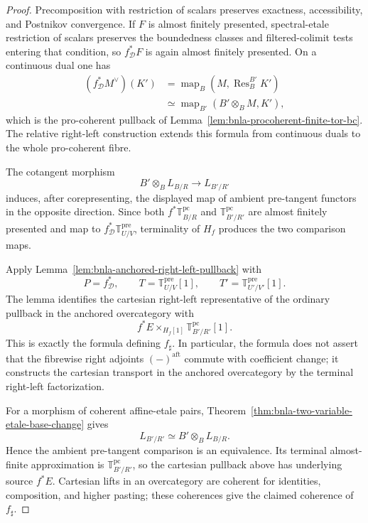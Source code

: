 \begin{proof}
Precomposition with restriction of scalars preserves exactness,
accessibility, and Postnikov convergence.  If $F$ is almost finitely
presented, spectral-etale restriction of scalars preserves the boundedness
classes and filtered-colimit tests entering that condition, so
$f_{\mathcal D}^*F$ is again almost finitely presented.  On a continuous
dual one has
\[
\begin{aligned}
(f_{\mathcal D}^*M^\vee)(K')
&=\operatorname{map}_B(M,\operatorname{Res}^{B'}_BK')\\
&\simeq
\operatorname{map}_{B'}(B'\otimes_BM,K'),
\end{aligned}
\]
which is the pro-coherent pullback of
Lemma~\ref{lem:bnla-procoherent-finite-tor-bc}.  The relative right-left
construction extends this formula from continuous duals to the whole
pro-coherent fibre.

The cotangent morphism
\[
    B'\otimes_BL_{B/R}
    \longrightarrow
    L_{B'/R'}
\]
induces, after corepresenting, the displayed map of ambient pre-tangent
functors in the opposite direction.  Since both
$f^*\mathbb T^{\mathrm{pc}}_{B/R}$ and
$\mathbb T^{\mathrm{pc}}_{B'/R'}$ are almost finitely presented and map to
$f_{\mathcal D}^*\mathbb T^{\mathrm{pre}}_{U/V}$, terminality of $H_f$
produces the two comparison maps.

Apply Lemma~\ref{lem:bnla-anchored-right-left-pullback} with
\[
    P=f_{\mathcal D}^*,
    \qquad
    T=\mathbb T^{\mathrm{pre}}_{U/V}[1],
    \qquad
    T'=\mathbb T^{\mathrm{pre}}_{U'/V'}[1].
\]
The lemma identifies the cartesian right-left representative of the ordinary
pullback in the anchored overcategory with
\[
    f^*E
    \times_{H_f[1]}
    \mathbb T^{\mathrm{pc}}_{B'/R'}[1].
\]
This is exactly the formula defining $f_\sharp$.  In particular, the formula
does not assert that the fibrewise right adjoints
$(-)^{\mathrm{aft}}$ commute with coefficient change; it constructs the
cartesian transport in the anchored overcategory by the terminal
right-left factorization.

For a morphism of coherent affine-etale pairs,
Theorem~\ref{thm:bnla-two-variable-etale-base-change} gives
\[
    L_{B'/R'}\simeq B'\otimes_BL_{B/R}.
\]
Hence the ambient pre-tangent comparison is an equivalence.  Its terminal
almost-finite approximation is
$\mathbb T^{\mathrm{pc}}_{B'/R'}$, so the cartesian pullback above has
underlying source $f^*E$.  Cartesian lifts in an overcategory are coherent
for identities, composition, and higher pasting; these coherences give the
claimed coherence of $f_\sharp$.
\end{proof}

